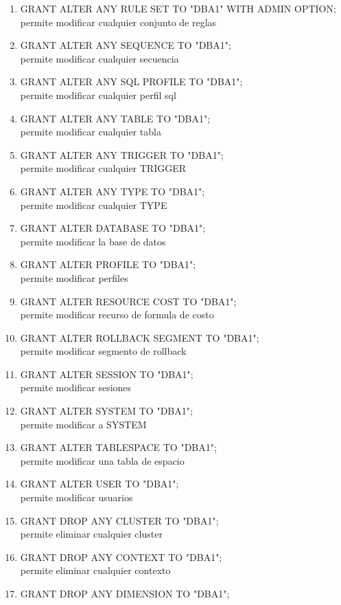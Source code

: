 \begin{enumerate}
\item GRANT ALTER ANY RULE SET TO "DBA1" WITH ADMIN OPTION;
\\permite modificar cualquier conjunto de reglas
\item GRANT ALTER ANY SEQUENCE TO "DBA1";
\\permite modificar cualquier secuencia
\item GRANT ALTER ANY SQL PROFILE TO "DBA1";
\\permite modificar cualquier perfil sql
\item GRANT ALTER ANY TABLE TO "DBA1";
\\permite modificar cualquier tabla
\item GRANT ALTER ANY TRIGGER TO "DBA1";
\\permite modificar cualquier TRIGGER
\item GRANT ALTER ANY TYPE TO "DBA1";
\\permite modificar cualquier TYPE
\item GRANT ALTER DATABASE TO "DBA1";
\\permite modificar la base de datos
\item GRANT ALTER PROFILE TO "DBA1";
\\permite modificar  perfiles
\item GRANT ALTER RESOURCE COST TO "DBA1";
\\permite modificar recurso de formula de costo
\item GRANT ALTER ROLLBACK SEGMENT TO "DBA1";
\\permite modificar segmento de rollback
\item GRANT ALTER SESSION TO "DBA1";
\\permite modificar sesiones
\item GRANT ALTER SYSTEM TO "DBA1";
\\permite modificar a SYSTEM
\item GRANT ALTER TABLESPACE TO "DBA1";
\\permite modificar una tabla de espacio
\item GRANT ALTER USER TO "DBA1";
\\permite modificar usuarios
\item GRANT DROP ANY CLUSTER TO "DBA1";
\\permite eliminar cualquier cluster
\item GRANT DROP ANY CONTEXT TO "DBA1";
\\permite eliminar cualquier contexto
\item GRANT DROP ANY DIMENSION TO "DBA1";

\end{enumerate}
